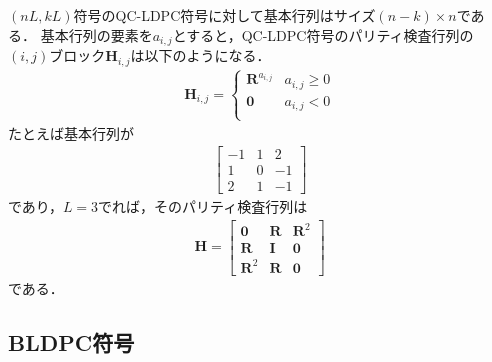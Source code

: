 \documentclass[twocolumn, a4paper]{ieicejsp}
\begin{document}
$(nL, kL)$符号のQC-LDPC符号に対して基本行列はサイズ$(n-k) \times n$である．
基本行列の要素を$a_{i,j}$とすると，QC-LDPC符号のパリティ検査行列の$(i,j)$ブロック$\mathbf{H}_{i,j}$は以下のようになる．
\begin{align}
  \mathbf{H}_{i,j} = \begin{cases}
    \mathbf{R}^{a_{i,j}} & a_{i,j} \geq 0 \\
    \mathbf{0} & a_{i,j} < 0 \\
  \end{cases}
\end{align}
たとえば基本行列が
\begin{align}
  \begin{bmatrix}
    -1 & 1 & 2 \\
    1 & 0 & -1 \\
    2 & 1 & -1
  \end{bmatrix}
\end{align}
であり，$L=3$でれば，そのパリティ検査行列は
\begin{align}
  \mathbf{H} = \begin{bmatrix}
    \mathbf{0} & \mathbf{R} & \mathbf{R}^2 \\
    \mathbf{R} & \mathbf{I} & \mathbf{0} \\
    \mathbf{R}^2 & \mathbf{R} & \mathbf{0}
  \end{bmatrix}
\end{align}
である．

\subsection{BLDPC符号\cite{QCLDPC}}
\end{document}
